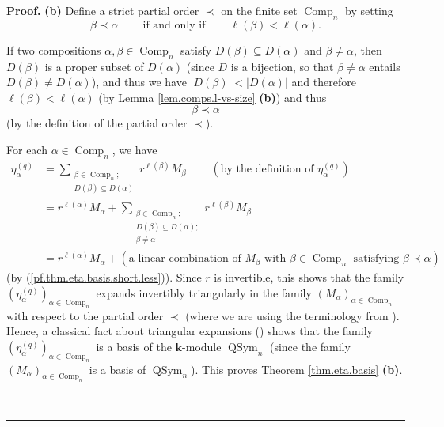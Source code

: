 \documentclass[numbers=enddot,12pt,final,onecolumn,notitlepage]{scrartcl}%
\theoremstyle{definition}
\newenvironment{proof}[1][Proof]{\noindent\textbf{#1.} }{\ \rule{0.5em}{0.5em}}
\let\sumnonlimits\sum
\renewcommand{\sum}{\sumnonlimits\limits}
\newenvironment{vershort}{}{}
\begin{document}
\begin{vershort}


\begin{proof}
\textbf{(b)} Define a strict partial order $\prec$ on the finite set
$\operatorname*{Comp}\nolimits_{n}$ by setting
\[
\beta\prec\alpha\ \ \ \ \ \ \ \ \ \ \text{if and only if}%
\ \ \ \ \ \ \ \ \ \ \ell\left(  \beta\right)  <\ell\left(  \alpha\right)  .
\]


If two compositions $\alpha,\beta\in\operatorname*{Comp}\nolimits_{n}$ satisfy
$D\left(  \beta\right)  \subseteq D\left(  \alpha\right)  $ and $\beta
\neq\alpha$, then $D\left(  \beta\right)  $ is a proper subset of $D\left(
\alpha\right)  $ (since $D$ is a bijection, so that $\beta\neq\alpha$ entails
$D\left(  \beta\right)  \neq D\left(  \alpha\right)  $), and thus we have
$\left\vert D\left(  \beta\right)  \right\vert <\left\vert D\left(
\alpha\right)  \right\vert $ and therefore $\ell\left(  \beta\right)
<\ell\left(  \alpha\right)  $ (by Lemma \ref{lem.comps.l-vs-size}
\textbf{(b)}) and thus%
\begin{equation}
\beta\prec\alpha\label{pf.thm.eta.basis.short.less}%
\end{equation}
(by the definition of the partial order $\prec$).

For each $\alpha\in\operatorname*{Comp}\nolimits_{n}$, we have%
\begin{align*}
\eta_{\alpha}^{\left(  q\right)  }  &  =\sum_{\substack{\beta\in
\operatorname*{Comp}\nolimits_{n};\\D\left(  \beta\right)  \subseteq D\left(
\alpha\right)  }}r^{\ell\left(  \beta\right)  }M_{\beta}%
\ \ \ \ \ \ \ \ \ \ \left(  \text{by the definition of }\eta_{\alpha}^{\left(
q\right)  }\right) \\
&  =r^{\ell\left(  \alpha\right)  }M_{\alpha}+\sum_{\substack{\beta
\in\operatorname*{Comp}\nolimits_{n};\\D\left(  \beta\right)  \subseteq
D\left(  \alpha\right)  ;\\\beta\neq\alpha}}r^{\ell\left(  \beta\right)
}M_{\beta}\\
&  =r^{\ell\left(  \alpha\right)  }M_{\alpha}+\left(  \text{a linear
combination of }M_{\beta}\text{ with }\beta\in\operatorname*{Comp}%
\nolimits_{n}\text{ satisfying }\beta\prec\alpha\right)
\end{align*}
(by (\ref{pf.thm.eta.basis.short.less})). Since $r$ is invertible, this shows
that the family $\left(  \eta_{\alpha}^{\left(  q\right)  }\right)
_{\alpha\in\operatorname*{Comp}\nolimits_{n}}$ expands invertibly triangularly
in the family $\left(  M_{\alpha}\right)  _{\alpha\in\operatorname*{Comp}%
\nolimits_{n}}$ with respect to the partial order $\prec$ (where we are using
the terminology from \cite[\S 11.1]{GriRei}). Hence, a classical fact about
triangular expansions (\cite[Corollary 11.1.19(e)]{GriRei}) shows that the
family $\left(  \eta_{\alpha}^{\left(  q\right)  }\right)  _{\alpha
\in\operatorname*{Comp}\nolimits_{n}}$ is a basis of the $\mathbf{k}$-module
$\operatorname*{QSym}\nolimits_{n}$ (since the family $\left(  M_{\alpha
}\right)  _{\alpha\in\operatorname*{Comp}\nolimits_{n}}$ is a basis of
$\operatorname*{QSym}\nolimits_{n}$). This proves Theorem \ref{thm.eta.basis}
\textbf{(b)}. \medskip


\end{proof}
\end{vershort}
\end{document}
